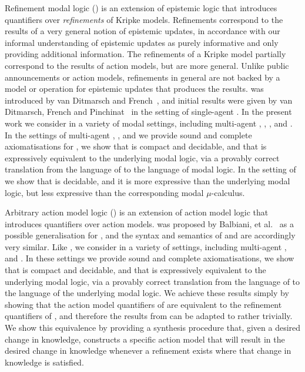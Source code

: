 Refinement modal logic (\logicRml{}) is an extension of epistemic logic that introduces quantifiers over {\em refinements} of Kripke models.
Refinements correspond to the results of a very general notion of epistemic updates, in accordance with our informal understanding of epistemic updates as purely informative and only providing additional information.
The refinements of a Kripke model partially correspond to the results of action models, but are more general.
Unlike public announcements or action models, refinements in general are not backed by a model or operation for epistemic updates that produces the results.
\logicRml{} was introduced by van Ditmarsch and French~\cite{vanditmarsch:2009}, and initial results were given by van Ditmarsch, French and Pinchinat~\cite{vanditmarsch:2010} in the setting of single-agent \classK{}.
In the present work we consider \logicRml{} in a variety of modal settings, including multi-agent \classK{}, \classKF{}, \classKFF{}, \classKD{} and \classS{}.
In the settings of multi-agent \classK{}, \classKFF{}, \classKD{} and \classS{} we provide sound and complete axiomatisations for \logicRml{}, we show that \logicRml{} is compact and decidable, and that \logicRml{} is expressively equivalent to the underlying modal logic, via a provably correct translation from the language of \logicRml{} to the language of modal logic.
In the setting of \classKF{} we show that \logicRml{} is decidable, and it is more expressive than the underlying modal logic, but less expressive than the corresponding modal $\mu$-calculus.

Arbitrary action model logic (\logicAaml{}) is an extension of action model logic that introduces quantifiers over action models.
\logicAaml{} was proposed by Balbiani, et al.~\cite{balbiani:2007} as a possible generalisation for \logicApal{}, and the syntax and semantics of \logicAaml{} and \logicApal{} are accordingly very similar.
Like \logicRml{}, we consider \logicAaml{} in a variety of settings, including multi-agent \classK{}, \classKFF{} and \classS{}.
In these settings we provide sound and complete axiomatisations, we show that \logicAaml{} is compact and decidable, and that \logicAaml{} is expressively equivalent to the underlying modal logic, via a provably correct translation from the language of \logicAaml{} to the language of the underlying modal logic.
We achieve these results simply by showing that the action model quantifiers of \logicAaml{} are equivalent to the refinement quantifiers of \logicRml{}, and therefore the results from \logicRml{} can be adapted to \logicAaml{} rather trivially.
We show this equivalence by providing a synthesis procedure that, given a desired change in knowledge, constructs a specific action model that will result in the desired change in knowledge whenever a refinement exists where that change in knowledge is satisfied.

